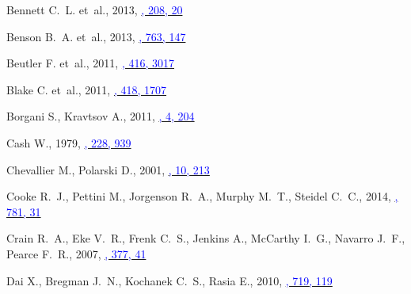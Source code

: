 \documentclass[useAMS,usenatbib,usegraphicx]{mn2e}
\begin{document}
\begin{thebibliography}{}
{Bennett} C.~L. et~al., 2013,
  \href{http://adsabs.harvard.edu/abs/2013ApJS..208...20B}{\textcolor{blue}{\apjs,
  208, 20}}

{Benson} B.~A. et~al., 2013,
  \href{http://adsabs.harvard.edu/abs/2013ApJ...763..147B}{\textcolor{blue}{\apj,
  763, 147}}

{Beutler} F. et~al., 2011,
  \href{http://adsabs.harvard.edu/abs/2011MNRAS.416.3017B}{\textcolor{blue}{\mnras,
  416, 3017}}

{Blake} C. et~al., 2011,
  \href{http://adsabs.harvard.edu/abs/2011MNRAS.418.1707B}{\textcolor{blue}{\mnras,
  418, 1707}}

{Borgani} S.,  {Kravtsov} A., 2011,
  \href{http://adsabs.harvard.edu/abs/2009arXiv0906.4370B}{\textcolor{blue}{\asl,
  4, 204}}

{Cash} W., 1979,
  \href{http://adsabs.harvard.edu/abs/1979ApJ...228..939C}{\textcolor{blue}{\apj,
  228, 939}}

{Chevallier} M.,  {Polarski} D., 2001,
  \href{http://adsabs.harvard.edu/abs/2001IJMPD..10..213C}{\textcolor{blue}{\ijmpd,
  10, 213}}

{Cooke} R.~J., {Pettini} M., {Jorgenson} R.~A., {Murphy} M.~T.,  {Steidel}
  C.~C., 2014,
  \href{http://adsabs.harvard.edu/abs/2014ApJ...781...31C}{\textcolor{blue}{\apj,
  781, 31}}

{Crain} R.~A., {Eke} V.~R., {Frenk} C.~S., {Jenkins} A., {McCarthy} I.~G.,
  {Navarro} J.~F.,  {Pearce} F.~R., 2007,
  \href{http://adsabs.harvard.edu/abs/2007MNRAS.377...41C}{\textcolor{blue}{\mnras,
  377, 41}}

{Dai} X., {Bregman} J.~N., {Kochanek} C.~S.,  {Rasia} E., 2010,
  \href{http://adsabs.harvard.edu/abs/2010ApJ...719..119D}{\textcolor{blue}{\apj,
  719, 119}}


\end{thebibliography}
\end{document}
